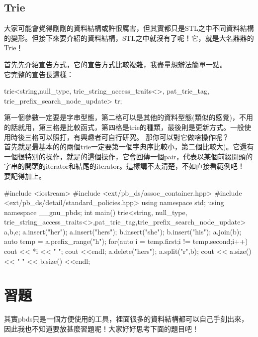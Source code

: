 \documentclass[main.tex]{subfiles}
\begin{document}
\subsection{Trie}
大家可能會覺得剛剛的資料結構或許很厲害，但其實都只是STL之中不同資料結構的變形。但接下來要介紹的資料結構，STL之中就沒有了呢！它，就是大名鼎鼎的Trie！

首先先介紹宣告方式，它的宣告方式比較複雜，我盡量想辦法簡單一點。\\
它完整的宣告長這樣：
\begin{C++}
trie<string,null_type, trie_string_access_traits<>, pat_trie_tag, trie_prefix_search_node_update> tr;
\end{C++}
第一個參數一定要是字串型態，第二格可以是其他的資料型態(類似的感覺)，不用的話就用，第三格是比較函式，第四格是trie的種類，最後則是更新方式。一般使用時後三格可以照打，有興趣者可自行研究。
那你可以對它做啥操作呢？\\
首先就是最基本的的兩個trie一定要第一個字典序比較小，第二個比較大)。它還有一個很特別的操作，就是的這個操作，它會回傳一個pair，代表以某個前綴開頭的字串的開頭的iterator和結尾的iterator。這樣講不太清楚，不如直接看範例吧！\\
要記得加上。\\
\begin{C++}
#include <iostream>
#include <ext/pb_ds/assoc_container.hpp>
#include <ext/pb_ds/detail/standard_policies.hpp>
using namespace std;
using namespace __gnu_pbds;
int main()
{
  trie<string, null_type, trie_string_access_traits<>,pat_trie_tag,trie_prefix_search_node_update> a,b,c;
  a.insert("her");
  a.insert("hers");
  b.insert("she");
  b.insert("his");
  a.join(b);
  auto temp = a.prefix_range("h");
  for(auto i = temp.first;i != temp.second;i++)
  {
    cout << *i << " ";
  }
  cout <<endl;
  a.delete("hers");
  a.split("r",b);
  cout << a.size() << " " << b.size() <<endl;
}
\end{C++}
\section{習題}
其實pbds只是一個方便使用的工具，裡面很多的資料結構都可以自己手刻出來，因此我也不知道要放甚麼習題呢！大家好好思考下面的題目吧！
\end{document}
